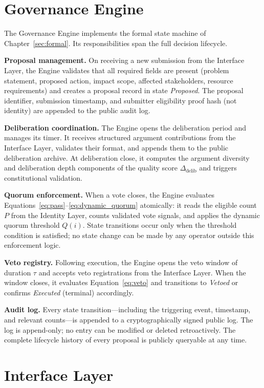 \documentclass[12pt,a4paper,oneside]{report}
\begin{document}
\section{Governance Engine}

The Governance Engine implements the formal state machine of Chapter~\ref{sec:formal}. Its responsibilities span the full decision lifecycle.

\textbf{Proposal management.} On receiving a new submission from the Interface Layer, the Engine validates that all required fields are present (problem statement, proposed action, impact scope, affected stakeholders, resource requirements) and creates a proposal record in state \textit{Proposed}. The proposal identifier, submission timestamp, and submitter eligibility proof hash (not identity) are appended to the public audit log.

\textbf{Deliberation coordination.} The Engine opens the deliberation period and manages its timer. It receives structured argument contributions from the Interface Layer, validates their format, and appends them to the public deliberation archive. At deliberation close, it computes the argument diversity and deliberation depth components of the quality score $\Delta_{\text{delib}}$ and triggers constitutional validation.

\textbf{Quorum enforcement.} When a vote closes, the Engine evaluates Equations~\ref{eq:pass}--\ref{eq:dynamic_quorum} atomically: it reads the eligible count $P$ from the Identity Layer, counts validated vote signals, and applies the dynamic quorum threshold $Q(i)$. State transitions occur only when the threshold condition is satisfied; no state change can be made by any operator outside this enforcement logic.

\textbf{Veto registry.} Following execution, the Engine opens the veto window of duration $\tau$ and accepts veto registrations from the Interface Layer. When the window closes, it evaluates Equation~\ref{eq:veto} and transitions to \textit{Vetoed} or confirms \textit{Executed} (terminal) accordingly.

\textbf{Audit log.} Every state transition---including the triggering event, timestamp, and relevant counts---is appended to a cryptographically signed public log. The log is append-only; no entry can be modified or deleted retroactively. The complete lifecycle history of every proposal is publicly queryable at any time.

\section{Interface Layer}
\end{document}
